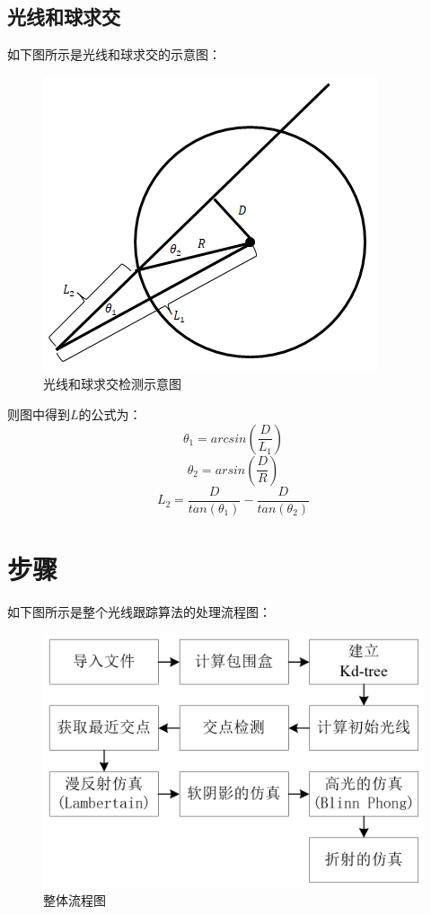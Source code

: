 \documentclass[10pt]{article}
\begin{document}
\subsection{光线和球求交}
如下图所示是光线和球求交的示意图：
\begin{figure}[H]
\begin{center}
\includegraphics[scale=0.6]{intersection_ray_sphere.png}
\caption{光线和球求交检测示意图}
\end{center}
\end{figure}
则图中得到$L$的公式为：
$$\theta_1=arcsin(\frac{D}{L_1})$$
$$\theta_2=arsin(\frac{D}{R})$$
$$L_2=\frac{D}{tan(\theta_1)}-\frac{D}{tan(\theta_2)}$$

\section{步骤}
如下图所示是整个光线跟踪算法的处理流程图：
\begin{figure}[H]
\begin{center}
\includegraphics[scale=0.3]{chart_flow.png}
\caption{整体流程图}
\end{center}
\end{figure}
\end{document}
